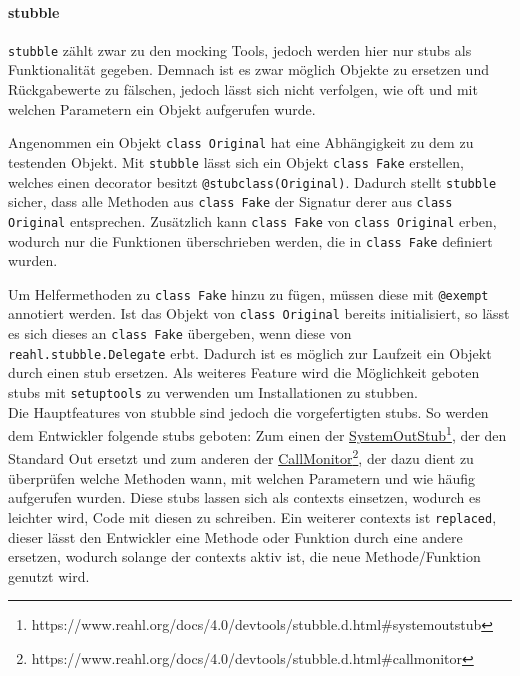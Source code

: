 \paragraph{stubble}\label{python-tools:stubble}\mbox{}
\newline
\lstinline{stubble} zählt zwar zu den \gls{mock}ing Tools, jedoch werden hier
nur \Glspl{stub} als Funktionalität gegeben. Demnach ist es zwar möglich
Objekte zu ersetzen und Rückgabewerte zu fälschen, jedoch lässt sich nicht
verfolgen, wie oft und mit welchen Parametern ein Objekt aufgerufen wurde.

Angenommen ein Objekt \lstinline{class Original} hat eine Abhängigkeit zu dem zu
testenden Objekt. Mit \lstinline{stubble} lässt sich ein Objekt
\lstinline{class Fake} erstellen, welches einen \gls{decorator} besitzt
\lstinline{@stubclass(Original)}. Dadurch stellt \lstinline{stubble} sicher,
dass alle Methoden aus \lstinline{class Fake} der Signatur derer aus
\lstinline{class Original} entsprechen. Zusätzlich kann \lstinline{class Fake}
von \lstinline{class Original} erben, wodurch nur die Funktionen überschrieben
werden, die in \lstinline{class Fake} definiert wurden.

Um Helfermethoden zu \lstinline{class Fake} hinzu zu fügen, müssen diese mit
\lstinline{@exempt} annotiert werden. Ist das Objekt von
\lstinline{class Original} bereits initialisiert, so lässt es sich dieses an
\lstinline{class Fake} übergeben, wenn diese von
\lstinline{reahl.stubble.Delegate} erbt. Dadurch ist es möglich zur Laufzeit
ein Objekt durch einen \Gls{stub} ersetzen. Als weiteres Feature wird die
Möglichkeit geboten \Glspl{stub} mit \lstinline{setuptools} zu verwenden um
Installationen zu \gls{stub}ben.
\newline
\\
Die Hauptfeatures von stubble sind jedoch die vorgefertigten \Glspl{stub}. So
werden dem Entwickler folgende \Glspl{stub} geboten:
Zum einen der
\href{https://www.reahl.org/docs/4.0/devtools/stubble.d.html\#systemoutstub}{SystemOutStub}\footnote{https://www.reahl.org/docs/4.0/devtools/stubble.d.html\#systemoutstub},
der den Standard Out ersetzt und zum anderen der
\href{https://www.reahl.org/docs/4.0/devtools/stubble.d.html\#callmonitor}{CallMonitor}\footnote{https://www.reahl.org/docs/4.0/devtools/stubble.d.html\#callmonitor},
der dazu dient zu überprüfen welche Methoden wann, mit welchen Parametern und
wie häufig aufgerufen wurden.
Diese \Glspl{stub} lassen sich als \glspl{context} einsetzen, wodurch es
leichter wird, Code mit diesen zu schreiben. Ein weiterer \Glspl{context} ist
\lstinline{replaced}, dieser lässt den Entwickler eine Methode oder Funktion
durch eine andere ersetzen, wodurch solange der \glspl{context} aktiv ist, die
neue Methode/Funktion genutzt wird.
\newline

